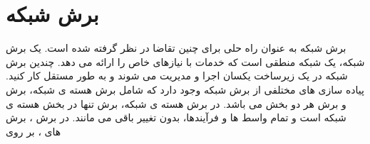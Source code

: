  \section{برش شبکه}
 برش شبکه
به عنوان راه حلی برای چنین تقاضا در نظر گرفته شده است.
یک برش شبکه، یک شبکه منطقی  است که خدمات  با نیازهای خاص را ارائه می دهد.
 چندین برش شبکه
در یک زیرساخت یکسان
  اجرا و مدیریت می شوند و
به طور مستقل کار کنید.
پیاده سازی های مختلفی از برش شبکه وجود دارد که شامل برش هسته ی شبکه، برش  و برش هر دو بخش می باشد.
در برش هسته ی شبکه، برش تنها در بخش هسته ی شبکه است و تمام واسط ها و فرآیندها، بدون تغییر باقی می مانند.
در برش ، 
برش های ، بر روی   